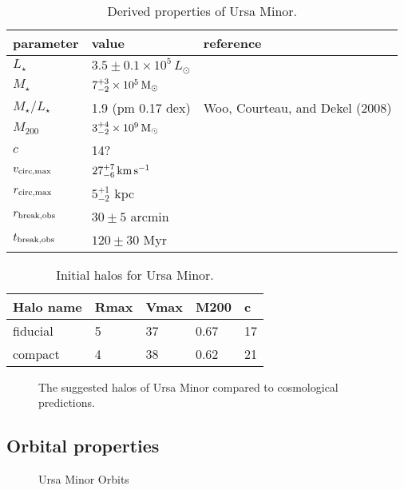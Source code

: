 \begin{table*}[t]
\centering
\caption[Derived Properties of Ursa Minor]{Derived properties of Ursa Minor. }
\label{tbl:umi_derived_props}
\begin{tabular}{lll}
\toprule
parameter & value & reference\\
\midrule
$L_\star$ & $3.5 \pm 0.1 \times 10^5\,L_\odot$ & \\
$M_\star$ & $7_{-2}^{+3} \times 10^5\,{\rm M}_{\odot}$ & \\
$M_\star / L_\star$ & 1.9 (pm 0.17 dex) & Woo, Courteau, and Dekel (2008)\\
$M_{200}$ & $3_{-2}^{+4} \times 10^9\,{\rm M}_{\odot}$ & \\
$c$ & 14? & \\
$v_{\rm circ, max}$ & $27_{-6}^{+7}\,{\rm km\,s^{-1}}$ & \\
$r_{\rm circ, max}$ & $5_{-2}^{+1}$ kpc & \\
$r_{\rm break, obs}$ & $30 \pm 5$ arcmin & \\
$t_{\rm break, obs}$ & $120\pm30$ Myr & \\
\bottomrule
\end{tabular}
\end{table*}

\begin{table*}[t]
\centering
\caption[Ursa Minor Initial Halos]{Initial halos for Ursa Minor. }
\label{tbl:umi_ini_halos}
\begin{tabular}{lllll}
\toprule
Halo name & Rmax & Vmax & M200 & c\\
\midrule
fiducial & 5 & 37 & 0.67 & 17\\
compact & 4 & 38 & 0.62 & 21\\
\bottomrule
\end{tabular}
\end{table*}

\begin{figure}
\centering
{}
\caption[Ursa Minor initial halos]{The suggested halos of Ursa Minor
compared to cosmological predictions.}
\end{figure}

\subsection{Orbital properties}\label{orbital-properties-1}

\begin{figure}
\centering
{}
\caption{Ursa Minor Orbits}
\end{figure}

